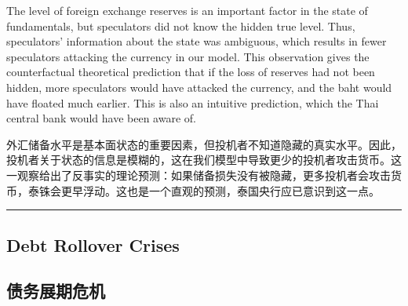 \documentclass[12pt,a4paper]{article}
\newenvironment{original}
  {\par\medskip\noindent\color{black}\ignorespaces}
  {\par\medskip}
\newenvironment{translation}
  {\par\noindent\color{darkblue}\ignorespaces}
  {\par\medskip\noindent\hrule\par\medskip}
\theoremstyle{definition}
\theoremstyle{remark}
\begin{document}
\begin{original}
The level of foreign exchange reserves is an important factor in the state of fundamentals, but speculators did not know the hidden true level. Thus, speculators' information about the state was ambiguous, which results in fewer speculators attacking the currency in our model. This observation gives the counterfactual theoretical prediction that if the loss of reserves had not been hidden, more speculators would have attacked the currency, and the baht would have floated much earlier. This is also an intuitive prediction, which the Thai central bank would have been aware of.
\end{original}
\begin{translation}
外汇储备水平是基本面状态的重要因素，但投机者不知道隐藏的真实水平。因此，投机者关于状态的信息是模糊的，这在我们模型中导致更少的投机者攻击货币。这一观察给出了反事实的理论预测：如果储备损失没有被隐藏，更多投机者会攻击货币，泰铢会更早浮动。这也是一个直观的预测，泰国央行应已意识到这一点。
\end{translation}

\subsection*{Debt Rollover Crises}
\subsection*{\color{darkblue}债务展期危机}
\end{document}
